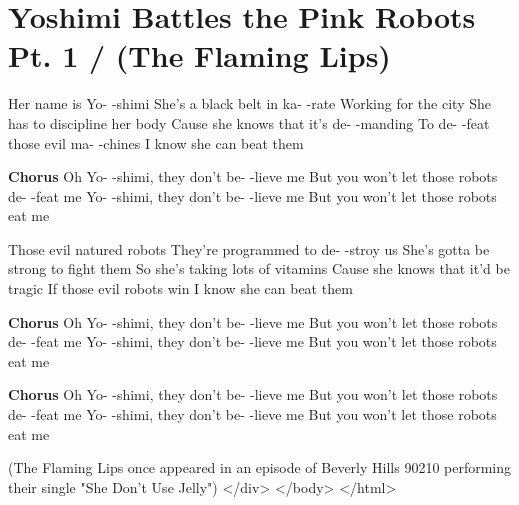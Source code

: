 \section{Yoshimi Battles the Pink Robots Pt. 1 / (The Flaming Lips)}\label{sec:yoshimi_battles_the_pink_robots_pt__1}



Her name is Yo- -shimi
She's a black belt in ka- -rate
Working for the city
She has to discipline her body
Cause she knows that it's de- -manding
To de- -feat those evil ma- -chines
I know she can beat them


\textbf{Chorus}
Oh Yo- -shimi, they don't be- -lieve me
But you won't let those robots de- -feat me
Yo- -shimi, they don't be- -lieve me
But you won't let those robots eat me


Those evil natured robots
They're programmed to de- -stroy us
She's gotta be strong to fight them
So she's taking lots of vitamins
Cause she knows that it'd be tragic
If those evil robots win
I know she can beat them

\textbf{Chorus}
Oh Yo- -shimi, they don't be- -lieve me
But you won't let those robots de- -feat me
Yo- -shimi, they don't be- -lieve me
But you won't let those robots eat me


\textbf{Chorus}
Oh Yo- -shimi, they don't be- -lieve me
But you won't let those robots de- -feat me
Yo- -shimi, they don't be- -lieve me
But you won't let those robots eat me


{\tiny (The Flaming Lips once appeared in an episode of Beverly Hills 90210
performing their single "She Don't Use Jelly")}
</div>
</body>
</html>
